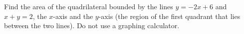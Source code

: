 Find the area of the quadrilateral bounded by the lines $y=-2x+6$ and $x+y=2$, the $x$-axis and the $y$-axis (the region of the first quadrant that lies between the two lines). Do not use a graphing calculator.
